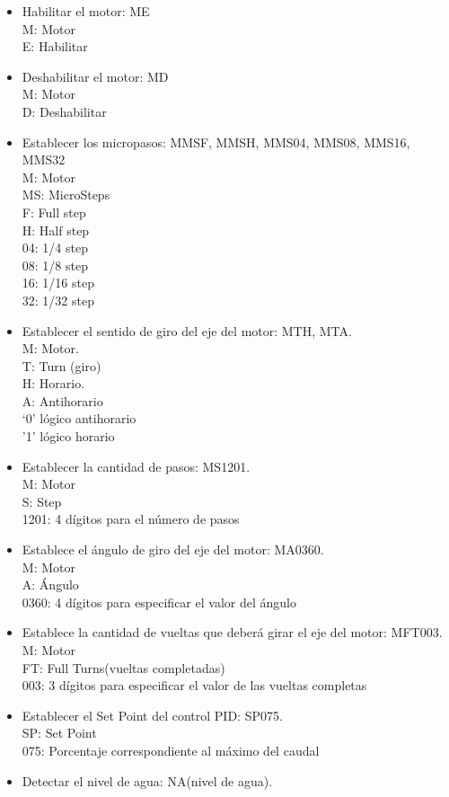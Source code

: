 \begin{itemize}
\item Habilitar el motor: ME \\
		\hspace{1cm} M: Motor	\\
		\hspace{1cm} E: Habilitar 
\item Deshabilitar el motor: MD \\
		M: Motor \\
		D: Deshabilitar
\item Establecer los micropasos: MMSF, MMSH, MMS04, MMS08, MMS16, MMS32 \\
		M: Motor \\
		MS: MicroSteps \\
		F: Full step \\
		H: Half step \\
		04: 1/4 step \\
		08: 1/8 step \\
		16: 1/16 step \\
		32: 1/32 step 
\item Establecer el sentido de giro del eje del motor: MTH, MTA.\\
		M: Motor. \\
		T: Turn (giro) \\
		H: Horario. \\
		A: Antihorario \\
		
		‘0’ lógico antihorario \\
		’1' lógico	 horario 		
\item	Establecer la cantidad de pasos: MS1201. \\
		M: Motor \\
		S: Step \\
		1201: 4 dígitos para el número de pasos 
\item	Establece el ángulo de giro del eje del motor: MA0360. \\
		M: Motor \\
		A: Ángulo \\
		0360: 4 dígitos para especificar el valor del ángulo 
\item  Establece la cantidad de vueltas que deberá girar el eje del motor: MFT003. \\
    M: Motor \\
    FT: Full Turns(vueltas completadas) \\
    003: 3 dígitos para especificar el valor de las vueltas completas 
\item Establecer el Set Point del control PID: SP075. \\
   SP: Set Point \\
   075: Porcentaje correspondiente al máximo del caudal 
\item Detectar el nivel de agua: NA(nivel de agua).

\end{itemize}


